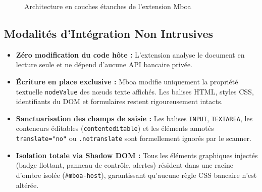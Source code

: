\documentclass[10pt,a4paper]{article}
\begin{document}
\begin{figure}[h]
\caption{Architecture en couches étanches de l'extension Mboa}
\end{figure}

\subsection{Modalités d'Intégration Non Intrusives}
\begin{itemize}
  \item \textbf{Zéro modification du code hôte :} L'extension analyse le document en lecture seule et ne dépend d'aucune API bancaire privée.
  \item \textbf{Écriture en place exclusive :} Mboa modifie uniquement la propriété textuelle \texttt{nodeValue} des nœuds texte affichés. Les balises HTML, styles CSS, identifiants du DOM et formulaires restent rigoureusement intacts.
  \item \textbf{Sanctuarisation des champs de saisie :} Les balises \texttt{INPUT}, \texttt{TEXTAREA}, les conteneurs éditables (\texttt{contenteditable}) et les éléments annotés \texttt{translate="no"} ou \texttt{.notranslate} sont formellement ignorés par le scanner.
  \item \textbf{Isolation totale via Shadow DOM :} Tous les éléments graphiques injectés (badge flottant, panneau de contrôle, alertes) résident dans une racine d'ombre isolée (\texttt{\#mboa-host}), garantissant qu'aucune règle CSS bancaire n'est altérée.
\end{itemize}
\end{document}
